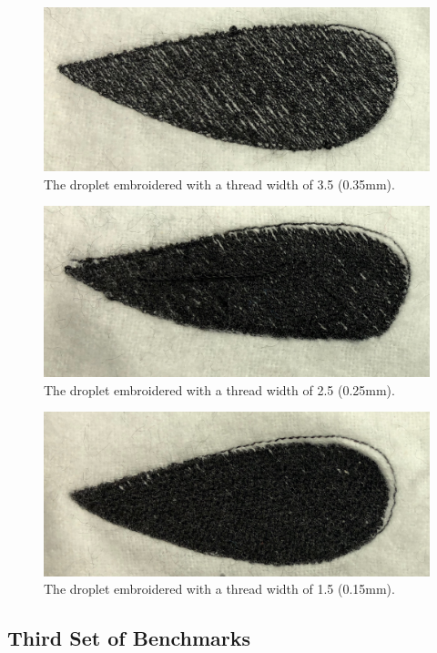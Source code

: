\documentclass{article}
\begin{document}
\begin{figure}[H]
    \centering
    \includegraphics[width=4.7in]{3_5w}
    \caption{The droplet embroidered with a thread width of 3.5 (0.35mm).}
    \label{3_5w}
\end{figure}

\begin{figure}[H]
    \centering
    \includegraphics[width=4.7in]{2_5w}
    \caption{The droplet embroidered with a thread width of 2.5 (0.25mm).}
    \label{2_5w}
\end{figure}

\begin{figure}[H]
    \centering
    \includegraphics[width=4.7in]{1_5w}
    \caption{The droplet embroidered with a thread width of 1.5 (0.15mm).}
    \label{1_5w}
\end{figure}

\subsection{Third Set of Benchmarks}
\end{document}
